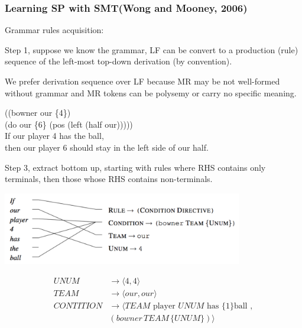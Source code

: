 \documentclass{beamer}
\begin{document}
\begin{frame}
    \frametitle{Learning SP with SMT(Wong and Mooney, 2006)}

    Grammar rules acquisition:

     {
        Step 1, suppose we know the grammar, LF can be convert to a production (rule) sequence
        of the left-most top-down derivation (by convention).

        We prefer derivation sequence over LF because MR may be not well-formed
        without grammar and MR tokens can be polysemy or carry no specific meaning.

        \begin{examples}
            ((bowner our \{4\}) \\
            (do our \{6\} (pos (left (half our))))) \\
            If our player 4 has the ball, \\
            then our player 6 should stay in the left side of our half.
        \end{examples}
    }


     {
        Step 3, extract bottom up, starting with rules where RHS contains only terminals,
        then those whose RHS contains non-terminals.
        \begin{center}
            \includegraphics[width=10.48cm,height=3.18cm]{img/wong-align.png}
        \end{center}
        \begin{align*}
            UNUM &\to \langle 4, 4 \rangle \\
            TEAM &\to \langle our, our \rangle \\
            CONTITION &\to \langle TEAM \text{ player } UNUM \text{ has \{1\} ball }, \\
                & (bowner\, TEAM\, \{UNUM\})\rangle
        \end{align*}
    }


\end{frame}
\end{document}
